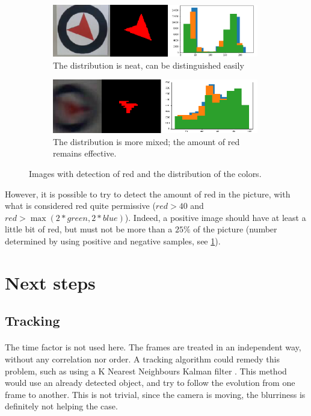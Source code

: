 \documentclass[12pt]{article}%
\begin{document}
\captionsetup[subfigure]{labelformat=simple, labelsep=period}
\begin{figure}
	\centering
	\begin{subfigure}[t]{10cm}
		\centering
		\includegraphics[width=9cm]{images/colorDistrib1.png}
		\caption{The distribution is neat, can be distinguished easily}
	\end{subfigure}
	\begin{subfigure}[t]{10cm}
		\centering
		\includegraphics[width=9cm]{images/colorDistrib2.png}
		\caption{The distribution is more mixed; the amount of red remains effective.}
	\end{subfigure}
	\caption{Images with detection of red and the distribution of the colors.}\label{fig:colorDistrib}
\end{figure}

However, it is possible to try to detect the amount of red in the picture, with what is considered red quite permissive ($red > 40$ and $red > \max(2*green, 2*blue)$). Indeed, a positive image should have at least a little bit of red, but must not be more than a $25\%$ of the picture (number determined by using positive and negative samples, see \ref{fig:colorDistrib}).


\section{Next steps}

\subsection{Tracking}

\paragraph{}
The time factor is not used here. The frames are treated in an independent way, without any correlation nor order. A tracking algorithm could remedy this problem, such as using a K Nearest Neighbours Kalman ﬁlter \cite{kalman}. This method would use an already detected object, and try to follow the evolution from one frame to another. This is not trivial, since the camera is moving, the blurriness is definitely not helping the case.
\end{document}

